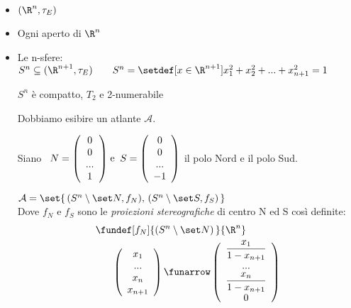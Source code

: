
\begin{itemize}
\item $(\R^n, \tau_E)$
\item Ogni aperto di $\R^n$
\item Le n-sfere: \, $S^n \subseteq (\R^{n+1}, \tau _E) \qquad S^n=\setdef[x\in \R^{n+1}]{x^2 _1 + x^2 _2 + ... + x^2 _{n+1} = 1}$

\begin{oss}
$S^n$ è compatto, $T_2$ e 2-numerabile

Dobbiamo esibire un atlante $\mathcal{A}$.

Siano  
\, \( N =  \left( \begin{array}{c}
0\\
0\\
...\\
1\end{array} \right) \;$e$ \;\; S =  \left( \begin{array}{c}
0\\
0\\
...\\
-1\end{array} \right)\)
il polo Nord e il polo Sud.

$\mathcal{A} = \set{\, (S^n \setminus \set N, f_N),\, (S^n \setminus \set S, f_S)\,}$ \\
Dove $f_N$ e $f_S$ sono le \emph{proiezioni stereografiche} di centro N ed S così definite: 
\begin{align*}
&\fundef[f_N]{(S^n \setminus \set N)\,}{\R^n}\\
&\;\;\;\;\;\; \left( \begin{array}{c}
x_1\\
...\\
x_n\\
x_{n+1}\end{array} \right)  \funarrow  \left( \begin{array}{c}
\dfrac{x_1}{1-x_{n+1}}\\
...\\
\dfrac{x_n}{1-x_{n+1}}\\
0\end{array} \right)
\end{align*}
\end{oss}
\end{itemize}